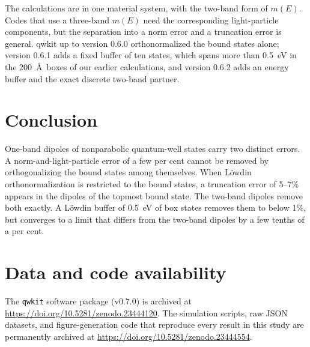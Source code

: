 \documentclass[11pt]{article}
\begin{document}
The calculations are in one material system, with the two-band form of $m(E)$. Codes that use a three-band $m(E)$ \cite{Sirtori1994} need the corresponding light-particle components, but the separation into a norm error and a truncation error is general. qwkit up to version 0.6.0 orthonormalized the bound states alone; version 0.6.1 adds a fixed buffer of ten states, which spans more than 0.5~eV in the 200~\AA\ boxes of our earlier calculations, and version 0.6.2 adds an energy buffer and the exact discrete two-band partner.

\section{Conclusion}
One-band dipoles of nonparabolic quantum-well states carry two distinct errors. A norm-and-light-particle error of a few per cent cannot be removed by orthogonalizing the bound states among themselves. When L\"owdin orthonormalization is restricted to the bound states, a truncation error of 5--7\% appears in the dipoles of the topmost bound state. The two-band dipoles remove both exactly. A L\"owdin buffer of 0.5~eV of box states removes them to below 1\%, but converges to a limit that differs from the two-band dipoles by a few tenths of a per cent.

\section*{Data and code availability}
The \texttt{qwkit} software package (v0.7.0) is archived at \url{https://doi.org/10.5281/zenodo.23444120}. The simulation scripts, raw JSON datasets, and figure-generation code that reproduce every result in this study are permanently archived at \url{https://doi.org/10.5281/zenodo.23444554}.



\end{document}
